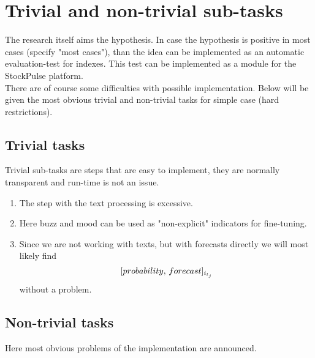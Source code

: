 \documentclass{article}
\begin{document}
\newpage
\section{Trivial and non-trivial sub-tasks}
The research itself aims the hypothesis. In case the hypothesis is positive in most cases (specify "most cases"), than the idea can be implemented as an automatic evaluation-test for indexes. This test can be implemented as a module for the StockPulse platform.\\
There are of course some difficulties with possible implementation. Below will be given the most obvious trivial and non-trivial tasks for simple case (hard restrictions).
\subsection{Trivial tasks}
Trivial sub-tasks are steps that are easy to implement, they are normally transparent and run-time is not an  issue.
\begin{enumerate}
	\item The step with the text processing is excessive.
	\item Here buzz and mood can be used as "non-explicit" indicators for fine-tuning.
	\item Since we are not working with texts, but with forecasts directly we will most likely find \[[probability,\thinspace forecast]_{i_{t_{j}}}\] without a problem.
	
\end{enumerate}  

\subsection{Non-trivial tasks}
Here most obvious problems of the implementation are announced.
\end{document}

